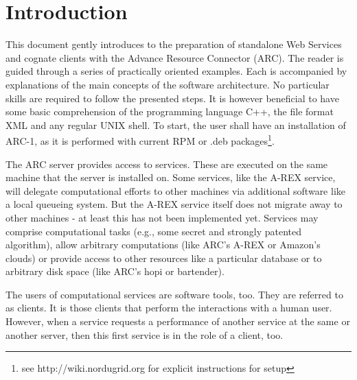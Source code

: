 
\chapter{Introduction}

This document gently introduces to the preparation of standalone Web Services and cognate clients with the Advance Resource Connector (ARC).
The reader is guided through a series of practically oriented examples.
Each is accompanied by explanations of the main concepts of the software architecture.
No particular skills are required to follow the presented steps.
It is however beneficial to have some basic comprehension of the programming language C++, the file format XML and any regular UNIX shell.
To start, the user shall have an installation of ARC-1, as it is performed with current RPM or .deb packages\footnote{see http://wiki.nordugrid.org for explicit instructions for setup}.


The ARC server provides access to services.
These are executed on the same machine that the server is installed on.
Some services, like the A-REX service, will delegate computational efforts to other machines
via additional software like a local queueing system.
But the A-REX service itself does not migrate away to other machines - at least this
has not been implemented yet.
Services may comprise computational tasks (e.g., some secret and strongly
patented algorithm), allow arbitrary computations (like ARC's A-REX or
Amazon's clouds) or provide access to other resources like a particular
database or to arbitrary disk space (like ARC's hopi or bartender).


The users of computational services are software tools, too.
They are referred to as clients.
It is those clients that perform the interactions with a human user.
However, when a service requests a performance of another service at the same or another server, then this first service is in the role of a client, too.


